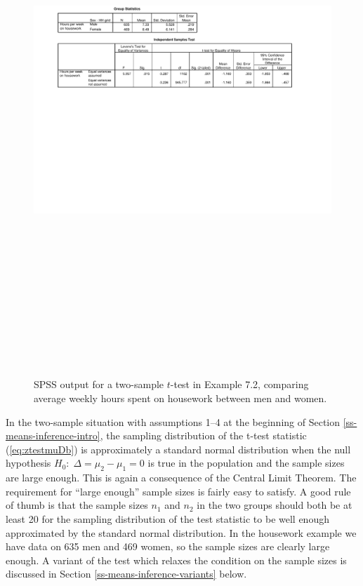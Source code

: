 \documentclass[11pt,a4paper,openany]{book}
\begin{document}
\begin{figure}[htbp]
\centering
\includegraphics[height=20.00000cm]{spss2t.pdf}
\caption{\label{fig:f-spss2test} SPSS output for a two-sample \(t\)-test in
Example 7.2, comparing average weekly hours spent on housework between
men and women.}
\end{figure}

\label{p-ztestass} In the two-sample situation with assumptions 1--4 at
the beginning of Section \ref{ss-means-inference-intro}, the sampling
distribution of the t-test statistic (\ref{eq:ztestmuDb}) is
approximately a standard normal distribution when the null hypothesis
\(H_{0}: \; \Delta=\mu_{2}-\mu_{1}=0\) is true in the population and the
sample sizes are large enough. This is again a consequence of the
Central Limit Theorem. The requirement for ``large enough'' sample sizes
is fairly easy to satisfy. A good rule of thumb is that the sample sizes
\(n_{1}\) and \(n_{2}\) in the two groups should both be at least 20 for
the sampling distribution of the test statistic to be well enough
approximated by the standard normal distribution. In the housework
example we have data on 635 men and 469 women, so the sample sizes are
clearly large enough. A variant of the test which relaxes the condition
on the sample sizes is discussed in Section
\ref{ss-means-inference-variants} below.
\end{document}
